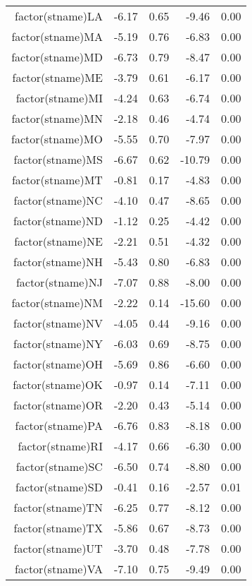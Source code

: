 \begin{table}[ht]
\begin{tabular}{rrrrr}
  factor(stname)LA & -6.17 & 0.65 & -9.46 & 0.00 \\ 
  factor(stname)MA & -5.19 & 0.76 & -6.83 & 0.00 \\ 
  factor(stname)MD & -6.73 & 0.79 & -8.47 & 0.00 \\ 
  factor(stname)ME & -3.79 & 0.61 & -6.17 & 0.00 \\ 
  factor(stname)MI & -4.24 & 0.63 & -6.74 & 0.00 \\ 
  factor(stname)MN & -2.18 & 0.46 & -4.74 & 0.00 \\ 
  factor(stname)MO & -5.55 & 0.70 & -7.97 & 0.00 \\ 
  factor(stname)MS & -6.67 & 0.62 & -10.79 & 0.00 \\ 
  factor(stname)MT & -0.81 & 0.17 & -4.83 & 0.00 \\ 
  factor(stname)NC & -4.10 & 0.47 & -8.65 & 0.00 \\ 
  factor(stname)ND & -1.12 & 0.25 & -4.42 & 0.00 \\ 
  factor(stname)NE & -2.21 & 0.51 & -4.32 & 0.00 \\ 
  factor(stname)NH & -5.43 & 0.80 & -6.83 & 0.00 \\ 
  factor(stname)NJ & -7.07 & 0.88 & -8.00 & 0.00 \\ 
  factor(stname)NM & -2.22 & 0.14 & -15.60 & 0.00 \\ 
  factor(stname)NV & -4.05 & 0.44 & -9.16 & 0.00 \\ 
  factor(stname)NY & -6.03 & 0.69 & -8.75 & 0.00 \\ 
  factor(stname)OH & -5.69 & 0.86 & -6.60 & 0.00 \\ 
  factor(stname)OK & -0.97 & 0.14 & -7.11 & 0.00 \\ 
  factor(stname)OR & -2.20 & 0.43 & -5.14 & 0.00 \\ 
  factor(stname)PA & -6.76 & 0.83 & -8.18 & 0.00 \\ 
  factor(stname)RI & -4.17 & 0.66 & -6.30 & 0.00 \\ 
  factor(stname)SC & -6.50 & 0.74 & -8.80 & 0.00 \\ 
  factor(stname)SD & -0.41 & 0.16 & -2.57 & 0.01 \\ 
  factor(stname)TN & -6.25 & 0.77 & -8.12 & 0.00 \\ 
  factor(stname)TX & -5.86 & 0.67 & -8.73 & 0.00 \\ 
  factor(stname)UT & -3.70 & 0.48 & -7.78 & 0.00 \\ 
  factor(stname)VA & -7.10 & 0.75 & -9.49 & 0.00 \\ 

\end{tabular}
\end{table}
